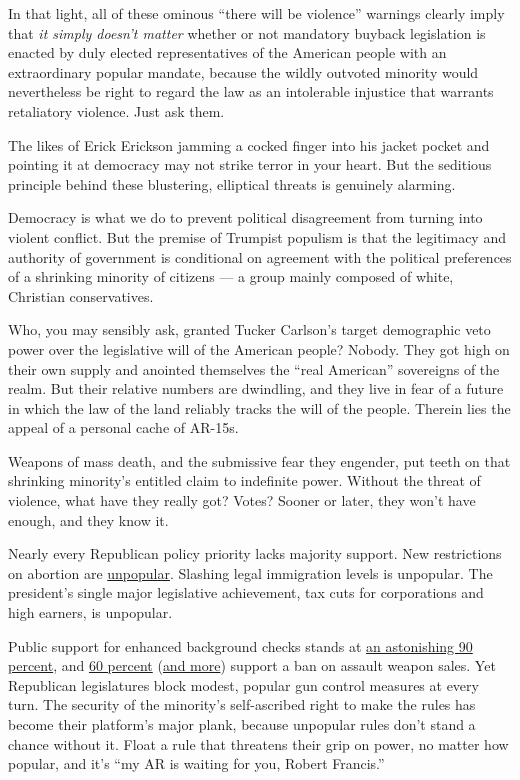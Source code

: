 In that light, all of these ominous ``there will be violence'' warnings
clearly imply that \emph{it simply doesn't matter} whether or not
mandatory buyback legislation is enacted by duly elected representatives
of the American people with an extraordinary popular mandate, because
the wildly outvoted minority would nevertheless be right to regard the
law as an intolerable injustice that warrants retaliatory violence. Just
ask them.

The likes of Erick Erickson jamming a cocked finger into his jacket
pocket and pointing it at democracy may not strike terror in your heart.
But the seditious principle behind these blustering, elliptical threats
is genuinely alarming.

Democracy is what we do to prevent political disagreement from turning
into violent conflict. But the premise of Trumpist populism is that the
legitimacy and authority of government is conditional on agreement with
the political preferences of a shrinking minority of citizens --- a
group mainly composed of white, Christian conservatives.

Who, you may sensibly ask, granted Tucker Carlson's target demographic
veto power over the legislative will of the American people? Nobody.
They got high on their own supply and anointed themselves the ``real
American'' sovereigns of the realm. But their relative numbers are
dwindling, and they live in fear of a future in which the law of the
land reliably tracks the will of the people. Therein lies the appeal of
a personal cache of AR-15s.

Weapons of mass death, and the submissive fear they engender, put teeth
on that shrinking minority's entitled claim to indefinite power. Without
the threat of violence, what have they really got? Votes? Sooner or
later, they won't have enough, and they know it.

Nearly every Republican policy priority lacks majority support. New
restrictions on abortion are
\href{https://www.pbs.org/newshour/politics/new-abortion-laws-are-too-extreme-for-most-americans-poll-shows}{unpopular}.
Slashing legal immigration levels is unpopular. The president's single
major legislative achievement, tax cuts for corporations and high
earners, is unpopular.

Public support for enhanced background checks stands at
\href{https://www.suffolk.edu/news-features/news/2019/09/09/12/58/suffolk-university-usa-today-poll-guns-sept-2019}{an
astonishing 90 percent}, and
\href{https://www.suffolk.edu/-/media/suffolk/documents/academics/research-at-suffolk/suprc/polls/national/2019/9_9_2019_marginals_pdftxt.pdf?la=en\&hash=643B7DFBB5697987D73D59B15DC83E5F7D584CDA}{60
percent}
(\href{https://www.politico.com/story/2019/08/07/poll-most-voters-support-assault-weapons-ban-1452586}{and
more}) support a ban on assault weapon sales. Yet Republican
legislatures block modest, popular gun control measures at every turn.
The security of the minority's self-ascribed right to make the rules has
become their platform's major plank, because unpopular rules don't stand
a chance without it. Float a rule that threatens their grip on power, no
matter how popular, and it's ``my AR is waiting for you, Robert
Francis.''

